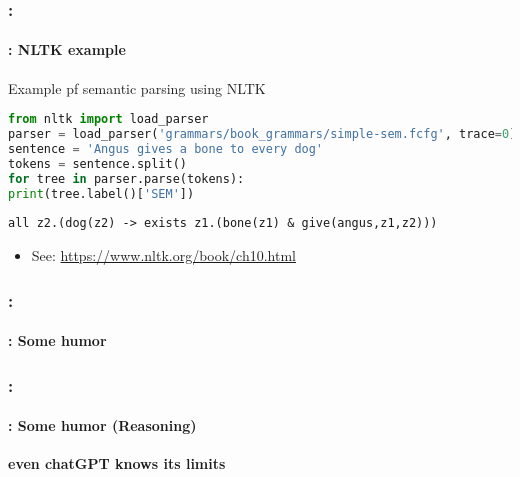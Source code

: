 \documentclass[xcolor=table]{beamer}
\begin{document}
\begin{frame}[fragile]
	\frametitle{\insertshortsubtitle: \insertsection}
	\framesubtitle{\insertsubsection: NLTK example}
	
	\begin{exampleblock}{Example pf semantic parsing using NLTK}
		{\scriptsize
			\begin{lstlisting}[language=Python]
from nltk import load_parser
parser = load_parser('grammars/book_grammars/simple-sem.fcfg', trace=0)
sentence = 'Angus gives a bone to every dog'
tokens = sentence.split()
for tree in parser.parse(tokens):
print(tree.label()['SEM'])
			\end{lstlisting}
		}
		
		{\scriptsize\bfseries
			\begin{lstlisting}
all z2.(dog(z2) -> exists z1.(bone(z1) & give(angus,z1,z2)))
			\end{lstlisting}
		}
		
	\end{exampleblock}
	
	\begin{itemize}
		\item See: \url{https://www.nltk.org/book/ch10.html}
	\end{itemize}
	
\end{frame}

\begin{frame}
	\frametitle{\insertshortsubtitle: \insertsection}
	\framesubtitle{\insertsubsection: Some humor}
	
	\begin{center}
	\end{center}
	
\end{frame}

\begin{frame}
	\frametitle{\insertshortsubtitle: \insertsection}
	\framesubtitle{\insertsubsection: Some humor (Reasoning)}
	
	\begin{center}\bfseries\large
		even chatGPT knows its limits
		
	\end{center}
	
\end{frame}


\end{document}
